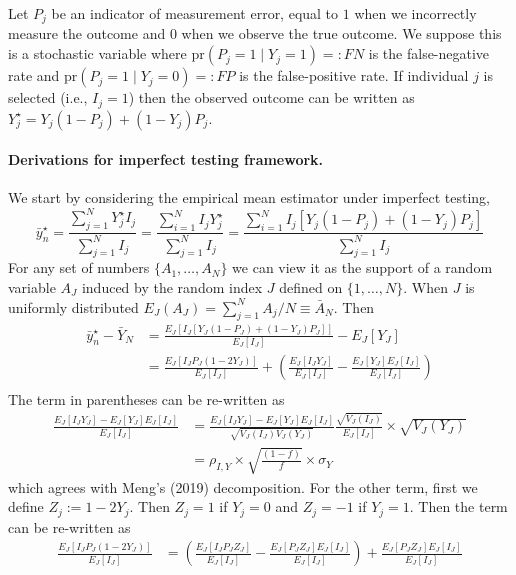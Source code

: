 \documentclass[12pt]{article}
\def\pr{\text{pr}}
\begin{document}
Let $P_j$ be an indicator of measurement error, equal to $1$ when we incorrectly measure the outcome and $0$ when we observe the true outcome. We suppose this is a stochastic variable where $\pr(P_j = 1 \mid Y_j = 1) =: FN$ is the false-negative rate and $\pr(P_j = 1 \mid Y_j = 0) =: FP$ is the false-positive rate.  If individual $j$ is selected (i.e., $I_j = 1$) then the observed outcome can be written as $Y_j^{\star} = Y_j(1-P_j) + (1-Y_j) P_j$.

\paragraph*{Derivations for imperfect testing framework.}
\label{app:imperfect}
We start by considering the empirical mean estimator under imperfect testing,
$$
\bar y_n^\star = \frac{\sum_{j=1}^N Y_j^\star I_j}{\sum_{j=1}^N I_j} = \frac{\sum_{i=1}^N  I_j Y_j^\star }{\sum_{j=1}^N  I_j } = \frac{\sum_{i=1}^N  I_j \left[ Y_j (1-P_j) + (1-Y_j) P_j \right]}{\sum_{j=1}^N  I_j }
$$
For any set of numbers $\{ A_1, \ldots, A_N \}$ we can view it as the support of a random variable $A_J$ induced by the random index $J$ defined on $\{1,\ldots, N\}$.  When $J$ is uniformly distributed $E_J (A_J) = \sum_{j=1}^N A_j / N \equiv \bar A_N$. Then
$$
\begin{aligned}
\bar y_n^\star  - \bar Y_N &= \frac{E_J \left[ I_J \left[ Y_J (1-P_J) + (1-Y_J) P_J \right] \right]}{E_J [ I_J ] } - E_J[Y_J] \\
&= \frac{E_J \left[ I_J P_J (1-2Y_J) \right]}{E_J [ I_J ] } + \left( \frac{E_J [I_J Y_J]}{E_J [ I_J ] } - \frac{E_J[Y_J] E_J[I_J]}{E_J[I_J]} \right) \\
\end{aligned}
$$
The term in parentheses can be re-written as
$$
\begin{aligned}
\frac{E_J [I_J Y_J]- E_J[Y_J] E_J[I_J]}{E_J[I_J]} &=  \frac{E_J [I_J Y_J]- E_J[Y_J] E_J[I_J]}{\sqrt{V_J(I_J) V_J(Y_J)}} \frac{\sqrt{V_J(I_J)}}{E_J[I_J]} \times \sqrt{V_J(Y_J)} \\
&= \rho_{I,Y} \times \sqrt{\frac{(1-f)}{f}} \times \sigma_Y
\end{aligned}
$$
which agrees with Meng's (2019) decomposition. For the other term, first we define $Z_j := 1 - 2 Y_j $. Then $Z_j = 1$ if $Y_j = 0$ and $Z_j = -1$ if $Y_j = 1$. Then the term can be re-written as
$$
\begin{aligned}
\frac{E_J \left[ I_J P_J (1-2Y_J) \right]}{E_J [ I_J ] } &= \left( \frac{E_J \left[ I_J P_J Z_J \right]}{E_J [ I_J ] } -  \frac{E_J \left[ P_J Z_J \right] E_J[ I_J]}{E_J [ I_J ] } \right) +  \frac{E_J \left[ P_J Z_J \right] E_J[ I_J]}{E_J [ I_J ] } \\
\end{aligned}
$$
\end{document}
